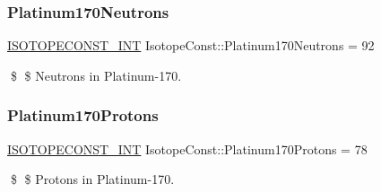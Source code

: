 \subsubsection{\texorpdfstring{Platinum170\+Neutrons}{Platinum170Neutrons}}
{\footnotesize\ttfamily \mbox{\hyperlink{group___isotope_const-_macros_ga5f18360b3e99483a35c32d789e62621c}{I\+S\+O\+T\+O\+P\+E\+C\+O\+N\+S\+T\+\_\+\+I\+NT}} Isotope\+Const\+::\+Platinum170\+Neutrons = 92}

\$ \$ Neutrons in Platinum-\/170. \mbox{\label{group___isotope_const-_platinum-_pt170_ga7e3b662020f87e183e4a2740183ce2a8}} 
\subsubsection{\texorpdfstring{Platinum170\+Protons}{Platinum170Protons}}
{\footnotesize\ttfamily \mbox{\hyperlink{group___isotope_const-_macros_ga5f18360b3e99483a35c32d789e62621c}{I\+S\+O\+T\+O\+P\+E\+C\+O\+N\+S\+T\+\_\+\+I\+NT}} Isotope\+Const\+::\+Platinum170\+Protons = 78}

\$ \$ Protons in Platinum-\/170. 